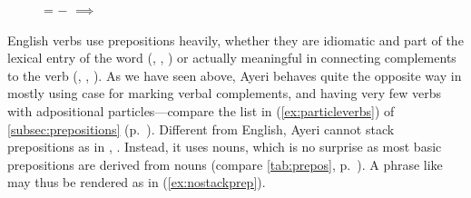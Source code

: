 \begin{figure}
\begin{morphlex}
\pex\label{ex:lingavanmorphlex}%
\a{}

\a{}

\a\label{ex:telcaserule}%
	\ups{\Tel} = $-$ $\implies$ \ups{\Obj{} \Case{}} \req{}
\Dat{}
\xe
\end{morphlex}
\end{figure}

English verbs use prepositions heavily, whether they are idiomatic and part of
the lexical entry of the word (, , ) or
actually meaningful in connecting complements to the verb (, 
, ). As we have seen above, Ayeri behaves quite the
opposite way in mostly using case for marking verbal complements, and having
very few verbs with adpositional particles---compare the list in
(\ref{ex:particleverbs}) of \autoref{subsec:prepositions}
(p.~\pageref{ex:particleverbs}). Different from English, Ayeri cannot stack
prepositions as in , . Instead, it uses nouns, which is no surprise as most basic
prepositions are derived from nouns (compare \autoref{tab:prepos},
p.~\pageref{tab:prepos}). A phrase like  may thus be
rendered as in (\ref{ex:nostackprep}).

